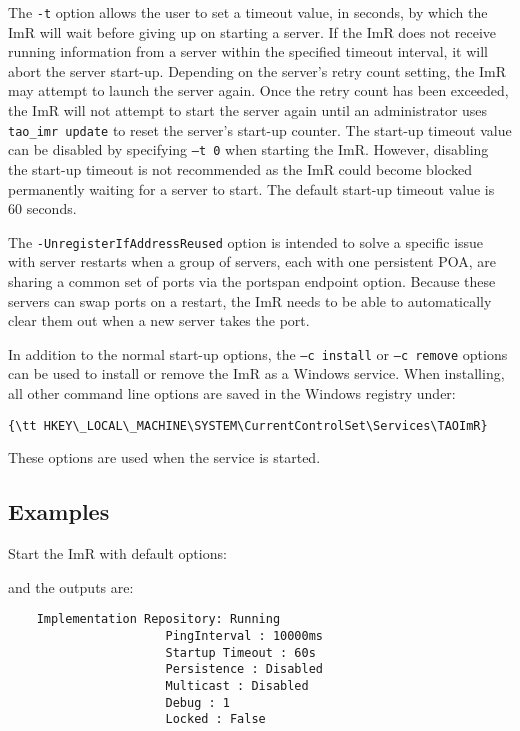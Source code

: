 \begin{itemize}
{\begin{itemize}
{\begin{description}
The {\tt -t} option allows the user to set a timeout value, in seconds, by which the ImR will wait before 
giving up on starting a server. If the ImR does not receive running information from a server within the 
specified timeout interval, it will abort the server start-up. Depending on the server’s retry count setting, 
the ImR may attempt to launch the server again. Once the retry count has been exceeded, the ImR will 
not attempt to start the server again until an administrator uses {\tt tao\_imr update} to reset the server’s 
 start-up counter. The start-up timeout value can be disabled by specifying {\tt–t 0} when starting the ImR.
However, disabling the start-up timeout is not recommended as the ImR could become blocked 
permanently waiting for a server to start. The default start-up timeout value is 60 seconds. 

The {\tt -UnregisterIfAddressReused} option is intended to solve a specific issue with server restarts 
when a group of servers, each with one persistent POA, are sharing a common set of ports via the 
portspan endpoint option. Because these servers can swap ports on a restart, the ImR needs to be able 
to automatically clear them out when a new server takes the port.

In addition to the normal start-up options, the {\tt–c install} or {\tt–c remove} options can be used to 
install or remove the ImR as a Windows service. When installing, all other command line options are 
saved in the Windows registry under: 

\small{
\begin{verbatim}
{\tt HKEY\_LOCAL\_MACHINE\SYSTEM\CurrentControlSet\Services\TAOImR}
\end{verbatim}
}

These options are used when the service is started.

\subsection{Examples}

Start the ImR with default options:


and the outputs are:

\begin{verbatim}
    Implementation Repository: Running 
                      PingInterval : 10000ms 
                      Startup Timeout : 60s 
                      Persistence : Disabled 
                      Multicast : Disabled 
                      Debug : 1 
                      Locked : False
\end{verbatim}


\end{description}}
\end{itemize}}
\end{itemize}
